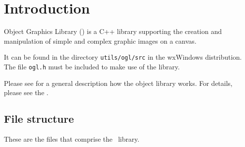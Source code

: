 \chapter{Introduction}
%
%
\setfooter{\thepage}{}{}{}{}{\thepage}

Object Graphics Library (\ogl) is a C++ library supporting the creation and
manipulation of simple and complex graphic images on a canvas.

It can be found in the directory {\tt utils/ogl/src} in the
wxWindows distribution. The file {\tt ogl.h} must be included to make use
of the library.

Please see  for a general description how the object library works. For details,
please see the .

\section{File structure}

These are the files that comprise the \ogl\ library.

